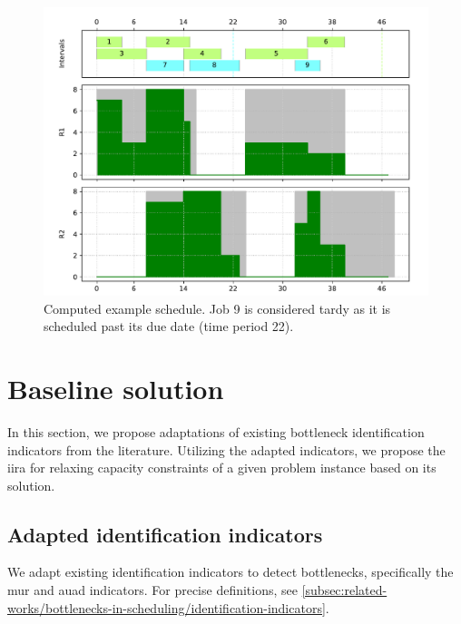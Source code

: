 \begin{figure}
    \centering
    \includegraphics[width=\textwidth]{img/example_solution_base.pdf}
    \caption{
        Computed example schedule.
        Job 9 is considered tardy as it is scheduled past its due date (time period 22).
        }
    \label{fig:example/base}
\end{figure}

\section{Baseline solution} \label{sec:solution-apporach/baseline-solution}

In this section, we propose adaptations of existing bottleneck identification indicators from the literature.
Utilizing the adapted indicators, we propose the \ac{iira}
for relaxing capacity constraints of a given problem instance based on its solution.

\subsection{Adapted identification indicators}

We adapt existing identification indicators to detect bottlenecks,
specifically the \acf{mur} and \acf{auad} indicators.
For precise definitions, see \cref{subsec:related-works/bottlenecks-in-scheduling/identification-indicators}.
        
